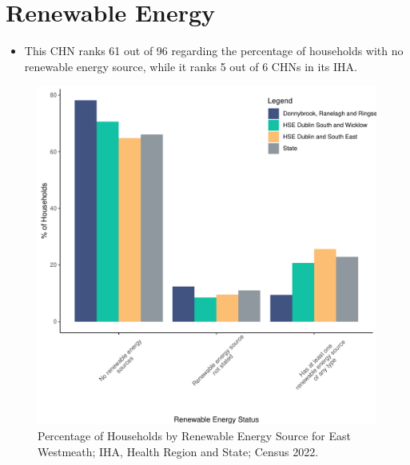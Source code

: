 \documentclass{article}
\begin{document}
\section{Renewable Energy}\label{sect:RE}
\begin{itemize}
\item This CHN ranks  61 out of 96 regarding the percentage of households with no renewable energy source, while it ranks   5 out of 6 CHNs in its IHA.
\end{itemize}
\begin{figure}[H]
	\centering
	\includegraphics[width = 140mm]{../figures/RenewableEnergyED.pdf}
	\caption{Percentage of Households by Renewable Energy Source for East Westmeath; IHA, Health Region and State; Census 2022.}
	\label{fig:vbnv}
	\end{figure}
\end{document}
